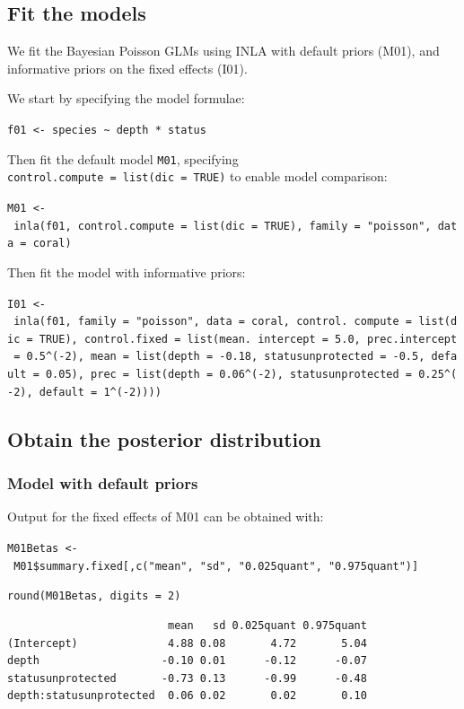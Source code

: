 \documentclass[
]{book}
\begin{document}
\hypertarget{nb-fit-models}{%
\subsection{Fit the models}\label{nb-fit-models}}

We fit the Bayesian Poisson GLMs using INLA with default priors (M01), and informative priors on the fixed effects (I01).

We start by specifying the model formulae:

\texttt{f01\ \textless{}-\ species\ \textasciitilde{}\ depth\ *\ status}

Then fit the default model \texttt{M01}, specifying \texttt{control.compute\ =\ list(dic\ =\ TRUE)} to enable model comparison:

\texttt{M01\ \textless{}-\ inla(f01,\ control.compute\ =\ list(dic\ =\ TRUE),\ family\ =\ "poisson",\ data\ =\ coral)}

Then fit the model with informative priors:

\texttt{I01\ \textless{}-\ inla(f01,\ family\ =\ "poisson",\ data\ =\ coral,\ control.\ compute\ =\ list(dic\ =\ TRUE),\ control.fixed\ =\ list(mean.\ intercept\ =\ 5.0,\ prec.intercept\ =\ 0.5\^{}(-2),\ mean\ =\ list(depth\ =\ -0.18,\ statusunprotected\ =\ -0.5,\ default\ =\ 0.05),\ prec\ =\ list(depth\ =\ 0.06\^{}(-2),\ statusunprotected\ =\ 0.25\^{}(-2),\ default\ =\ 1\^{}(-2))))}

\hypertarget{nb-post-dist}{%
\subsection{Obtain the posterior distribution}\label{nb-post-dist}}

\hypertarget{nb-def-priors}{%
\subsubsection{Model with default priors}\label{nb-def-priors}}

Output for the fixed effects of M01 can be obtained with:

\texttt{M01Betas\ \textless{}-\ M01\$summary.fixed{[},c("mean",\ "sd",\ "0.025quant",\ "0.975quant"){]}}

\texttt{round(M01Betas,\ digits\ =\ 2)}

\begin{verbatim}
                         mean   sd 0.025quant 0.975quant
(Intercept)              4.88 0.08       4.72       5.04
depth                   -0.10 0.01      -0.12      -0.07
statusunprotected       -0.73 0.13      -0.99      -0.48
depth:statusunprotected  0.06 0.02       0.02       0.10
\end{verbatim}
\end{document}
